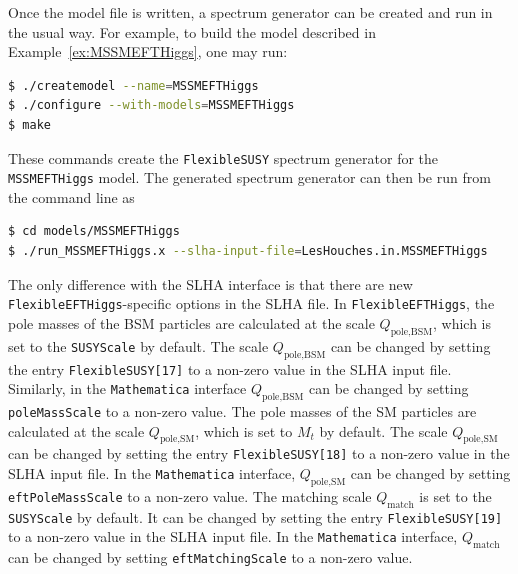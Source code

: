 \documentclass[final,3p,11pt,pdflatex]{elsarticle}
\makeatletter
\newcommand{\modelname}[1]{\texttt{#1}\@\xspace}
\newcommand{\fs}{\texttt{FlexibleSUSY}\@\xspace}
\newcommand{\feft}{\texttt{Flex\-ib\-le\-EFT\-Higgs}\@\xspace}
\newcommand{\mathematica}{\texttt{Ma\-the\-ma\-ti\-ca}\xspace}
\newcommand{\code}[1]{\lstinline|#1|}  %
\newcommand{\Qmatch}{\ensuremath{Q_\text{match}}}
\newcommand{\QpoleBSM}{\ensuremath{Q_\text{pole,BSM}}}
\newcommand{\QpoleSM}{\ensuremath{Q_\text{pole,SM}}}
\newcommand{\exref}[1]{Example~\ref{#1}}
\makeatother
\begin{document}
Once the model file is written, a spectrum generator can be created and
run in the usual way.  For example, to build the model described in
\exref{ex:MSSMEFTHiggs}, one may run:
%
\begin{lstlisting}[language=bash]
$ ./createmodel --name=MSSMEFTHiggs
$ ./configure --with-models=MSSMEFTHiggs
$ make
\end{lstlisting}%
%
These commands create the \fs spectrum generator for the
\modelname{MSSMEFTHiggs} model.  The generated spectrum generator can then
be run from the command line as
%
\begin{lstlisting}[language=bash]
$ cd models/MSSMEFTHiggs
$ ./run_MSSMEFTHiggs.x --slha-input-file=LesHouches.in.MSSMEFTHiggs
\end{lstlisting}%
%

The only difference with the SLHA interface is that there are new
\feft-specific options in the SLHA file. In \feft, the pole masses of
the BSM particles are calculated at the scale $\QpoleBSM$, which is
set to the \code{SUSYScale} by default.  The scale $\QpoleBSM$ can be
changed by setting the entry \code{FlexibleSUSY[17]} to a non-zero
value in the SLHA input file.  Similarly, in the \mathematica interface
$\QpoleBSM$ can be changed by setting \code{poleMassScale} to a
non-zero value.
%
The pole masses of the SM particles are calculated at the
scale $\QpoleSM$, which is set to $M_t$ by default.  The scale
$\QpoleSM$ can be changed by setting the entry \code{FlexibleSUSY[18]}
to a non-zero value in the SLHA input file.  In the \mathematica
interface, $\QpoleSM$ can be changed by setting \code{eftPoleMassScale}
to a non-zero value.
%
The matching scale $\Qmatch$ is set to the \code{SUSYScale} by
default.  It can be changed by setting the entry \code{FlexibleSUSY[19]} to a
non-zero value in the SLHA input file.  In the \mathematica interface,
$\Qmatch$ can be changed by setting \code{eftMatchingScale} to a
non-zero value.
\end{document}
